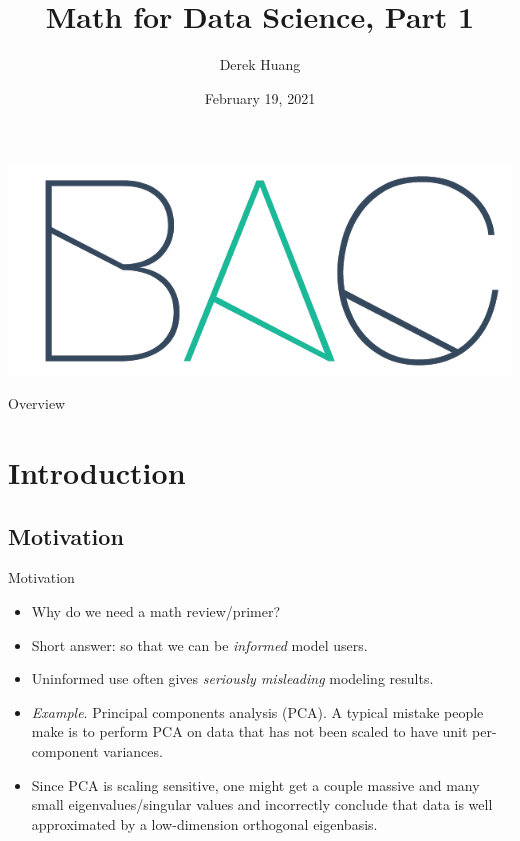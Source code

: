 \documentclass{beamer}
\title[Math for Data Science, Part 1]{Math for Data Science, Part 1}
\author[Derek Huang (BAC Advanced Team)]{Derek Huang}
\institute{BAC Advanced Team}
\date{February 19, 2021}
\numberwithin{equation}{section}
\begin{document}
\begin{frame}
    \titlepage
    \centering
    \includegraphics[scale = 0.1]{../bac_logo1.png}
\end{frame}

\begin{frame}{Overview}
	\tableofcontents
\end{frame}

\section{Introduction}

\subsection{Motivation}

\begin{frame}{Motivation}
    \begin{itemize}
        \item
        Why do we need a math review/primer?
        
        \item
        Short answer: so that we can be \textit{informed} model users.
        
        \item
        Uninformed use often gives \textit{seriously misleading} modeling
        results.

        \item
        \textit{Example}. Principal components analysis (PCA). A typical
        mistake people make\footnotemark{} is to perform PCA on data that has not been scaled to have unit
        per-component variances.

        \item
        Since PCA is scaling sensitive, one might get a couple massive
        and many small eigenvalues/singular values\footnotemark{} and incorrectly conclude that data is well approximated by a
        low-dimension orthogonal eigenbasis.
    \end{itemize}
\end{frame}
\end{document}

